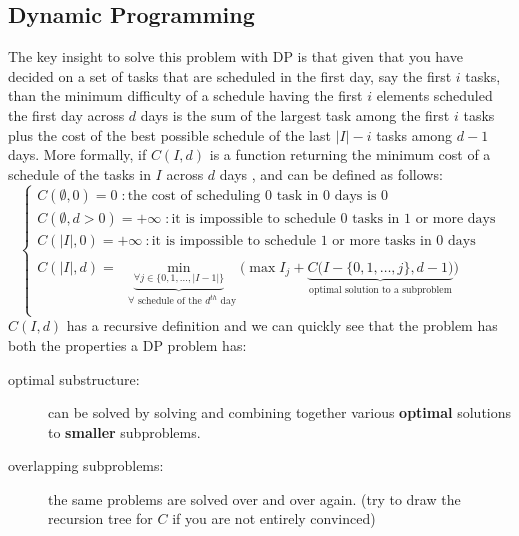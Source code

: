 \subsection{Dynamic Programming}
The key insight to solve this problem with DP is that given that you have decided on a set of tasks
that are scheduled in the first day, say the first $i$ tasks, than the minimum difficulty of a
schedule having the first $i$ elements scheduled the first day across $d$ days is the sum of the
largest task among the first $i$ tasks plus the cost of the best possible schedule of the last
$|I|-i$ tasks among $d-1$ days. More formally, if $C(I,d)$ is a function returning the minimum cost
of a schedule of the tasks in $I$ across $d$ days , and can be defined as follows:
\begin{equation}
    \begin{cases}
        C(\emptyset, 0) = 0 \; :  \text{the cost of scheduling $0$ task in $0$ days is $0$}\\
        C(\emptyset, d > 0) = +\infty \; : \text{it is impossible to schedule $0$ tasks in $1$ or more days}\\
        C(|I|, 0) = +\infty \: :\text{it is impossible to schedule $1$ or more tasks  in $0$ days}\\\\
		C(|I|, d) = \underbrace{\min_{\forall j \in \{0,1,\ldots,|I-1|\}}}_{\text{ $\forall$ schedule of the $d^{th}$ day}} \Bigg( \max I_j + \underbrace{C\Big(I - \{0,1,\ldots,j\}, d-1\Big)}_{\text{optimal solution to a subproblem}}\Bigg)\\
	 \end{cases}
	\label{eq:min_difficulty_job_scheduler:dpformula}
\end{equation}
$C(I,d)$ has a recursive definition and we can quickly see that the problem has both the properties
a DP problem has:
\begin{description}
    \item[optimal substructure:] can be solved by solving and combining together various
    \textbf{optimal} solutions to \textbf{smaller} subproblems.
    \item[overlapping subproblems:] the same problems are solved over and over again. (try to draw
    the recursion tree for $C$ if you are not entirely convinced)
\end{description}

